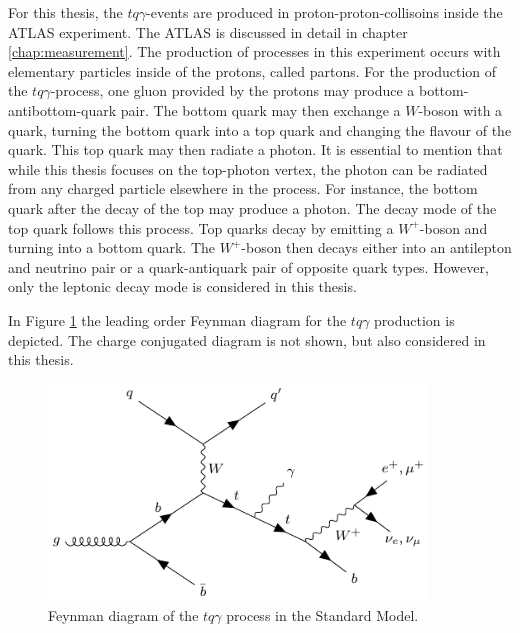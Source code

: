 For this thesis, the $tq\gamma$-events are produced in proton-proton-collisoins inside the ATLAS experiment. The ATLAS is discussed in detail in chapter \ref{chap:measurement}. The production of processes in this experiment occurs with elementary particles inside of the protons, called partons. For the production of the $tq\gamma$-process, one gluon provided by the protons may produce a bottom-antibottom-quark pair. The bottom quark may then exchange a $W$-boson with a quark, turning the bottom quark into a top quark and changing the flavour of the quark. This top quark may then radiate a photon. 
It is essential to mention that while this thesis focuses on the top-photon vertex, the photon can be radiated from any charged particle elsewhere in the process. For instance, the bottom quark after the decay of the top may produce a photon.
The decay mode of the top quark follows this process. Top quarks decay by emitting a $W^+$-boson and turning into a bottom quark. The $W^+$-boson then decays either into an antilepton and neutrino pair or a quark-antiquark pair of opposite quark types. However, only the leptonic decay mode is considered in this thesis.

In Figure \ref{fig:feyn_tqGamma} the leading order Feynman diagram for the $tq\gamma$ production is depicted. The charge conjugated diagram is not shown, but also considered in this thesis.
\begin{figure}
    \centering
    \includegraphics[width=0.9\textwidth]{Plots/s4_feyn_nom.pdf}
    \caption{Feynman diagram of the $tq\gamma$ process in the Standard Model.}
    \label{fig:feyn_tqGamma}
\end{figure}